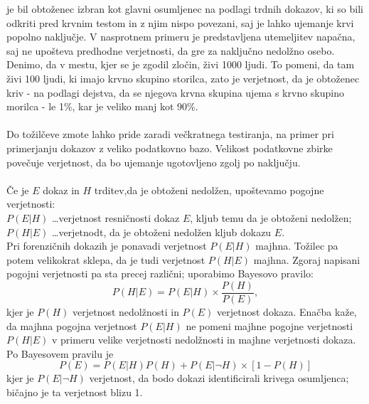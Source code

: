 \documentclass[12pt,a4paper]{amsart}
\theoremstyle{definition} %
\theoremstyle{plain} %
\begin{document}
je bil obtoženec izbran kot glavni osumljenec na podlagi trdnih dokazov, ki so bili odkriti pred krvnim testom in z njim nispo povezani, saj 
je lahko ujemanje krvi popolno naključje. V nasprotnem primeru je predstavljena utemeljitev napačna, saj ne upošteva predhodne verjetnosti, da 
gre za naključno nedolžno osebo. Denimo, da v mestu, kjer se je zgodil zločin, živi 1000 ljudi. To pomeni, da tam živi 100 ljudi, ki imajo 
krvno skupino storilca, zato je verjetnost, da je obtoženec kriv - na podlagi dejstva, da se njegova krvna skupina ujema s krvno skupino 
morilca - le 1\%, kar je veliko manj kot 90\%. \\\\
Do tožilčeve zmote lahko pride zaradi večkratnega testiranja, na primer pri primerjanju dokazov z veliko podatkovno bazo. Velikost podatkovne 
zbirke povečuje verjetnost, da bo ujemanje ugotovljeno zgolj po naključju. \\\\
Če je $E$ dokaz in $H$ trditev,da je obtoženi nedolžen, upoštevamo pogojne verjetnosti: \\
$P(E \lvert H)$ \dots verjetnost resničnosti dokaz $E$, kljub temu da je obtoženi nedolžen; \\
$P(H \lvert E)$ \dots verjetnodt, da je obtoženi nedolžen kljub dokazu $E$. \\
Pri forenzičnih dokazih je ponavadi verjetnost $P(E \lvert H)$ majhna. Tožilec pa potem velikokrat sklepa, da je tudi verjetnost 
$P(H \lvert E)$ majhna.
Zgoraj napisani pogojni verjetnosti pa sta precej različni; uporabimo Bayesovo pravilo:
\[
    P(H \lvert E) = P(E \lvert H) \times \frac{P(H)}{P(E)}, 
\]
kjer je $P(H)$ verjetnost nedolžnosti in $P(E)$ verjetnost dokaza. Enačba kaže, da majhna pogojna verjetnost $P(E \lvert H)$ ne pomeni majhne 
pogojne verjetnosti $P(H \lvert E)$ v primeru velike verjetnosti nedolžnosti in majhne verjetnosti dokaza. \\
Po Bayesovem pravilu je
\[
    P(E)=P(E \lvert H)P(H) + P(E \lvert \neg H)\times[1 - P(H)]
\]
kjer je $P(E \lvert \neg H)$ verjetnost, da bodo dokazi identificirali krivega osumljenca; bičajno je ta verjetnost blizu 1. 

\end{document}
